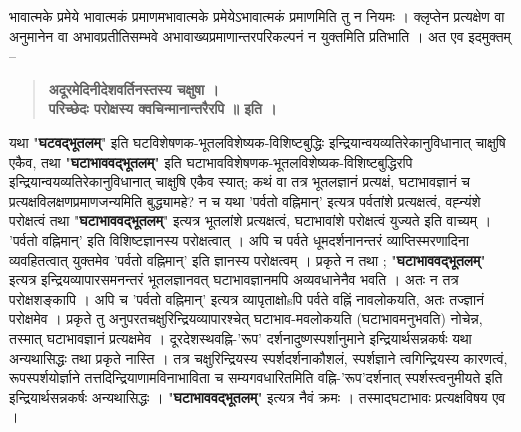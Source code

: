 भावात्मके प्रमेये भावात्मकं प्रमाणमभावात्मके प्रमेयेऽभावात्मकं प्रमाणमिति तु न नियमः । क्लृप्तेन प्रत्यक्षेण वा अनुमानेन वा अभावप्रतीतिसम्भवे अभावाख्यप्रमाणान्तरपरिकल्पनं न युक्तमिति प्रतिभाति । अत एव इदमुक्तम् –
\begin{verse}
\textbf{अदूरमेदिनीदेशवर्तिनस्तस्य चक्षुषा ।\\
परिच्छेदः परोक्षस्य क्वचिन्मानान्तरैरपि ॥ इति ।}
\end{verse}
यथा "\textbf{घटवद्भूतलम्}" इति घटविशेषणक-भूतलविशेष्यक-विशिष्टबुद्धिः इन्द्रियान्वयव्यतिरेकानुविधानात् चाक्षुषि एकैव, तथा "\textbf{घटाभाववद्भूतलम्}" इति घटाभावविशेषणक-भूतलविशेष्यक-विशिष्टबुद्धिरपि इन्द्रियान्वयव्यतिरेकानुविधानात् चाक्षुषि एकैव स्यात्; कथं वा तत्र भूतलज्ञानं प्रत्यक्षं, घटाभावज्ञानं च प्रत्यक्षविलक्षणप्रमाणजन्यमिति बुद्ध्यामहे? न च यथा 'पर्वतो वह्निमान्' इत्यत्र पर्वतांशे प्रत्यक्षत्वं, वह्न्यंशे परोक्षत्वं तथा "\textbf{घटाभाववद्भूतलम्}" इत्यत्र भूतलांशे प्रत्यक्षत्वं, घटाभावांशे परोक्षत्वं युज्यते इति वाच्यम् । 'पर्वतो वह्निमान्' इति विशिष्टज्ञानस्य परोक्षत्वात् । अपि च पर्वते धूमदर्शनानन्तरं व्याप्तिस्मरणादिना व्यवहितत्वात् युक्तमेव 'पर्वतो वह्निमान्' इति ज्ञानस्य परोक्षत्वम् । प्रकृते न तथा ; "\textbf{घटाभाववद्भूतलम्}" इत्यत्र इन्द्रियव्यापारसमनन्तरं भूतलज्ञानवत् घटाभावज्ञानमपि अव्यवधानेनैव भवति । अतः न तत्र परोक्षशङ्कापि । अपि च 'पर्वतो वह्निमान्' इत्यत्र व्यापृताक्षोsपि पर्वते वह्निं नावलोकयति, अतः तज्ज्ञानं परोक्षमेव । प्रकृते तु अनुपरतचक्षुरिन्द्रियव्यापारश्चेत् घटाभाव-मवलोकयति (घटाभावमनुभवति) नोचेन्न, तस्मात् घटाभावज्ञानं प्रत्यक्षमेव । दूरदेशस्थवह्नि-'रूप' दर्शनादुष्णस्पर्शानुमाने इन्द्रियार्थसन्नकर्षः यथा अन्यथासिद्धः तथा प्रकृते नास्ति । तत्र चक्षुरिन्द्रियस्य स्पर्शदर्शनाकौशलं, स्पर्शज्ञाने त्वगिन्द्रियस्य कारणत्वं, रूपस्पर्शयोर्ज्ञाने तत्तदिन्द्रियाणामविनाभाविता च सम्यगवधारितमिति वह्नि-'रूप'दर्शनात् स्पर्शस्त्वनुमीयते इति इन्द्रियार्थसन्नकर्षः अन्यथासिद्धः । "\textbf{घटाभाववद्भूतलम्}" इत्यत्र नैवं क्रमः । तस्माद्घटाभावः प्रत्यक्षविषय एव ।

